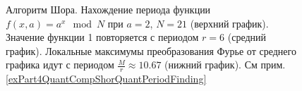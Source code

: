 \begin{figure}
\centering








\caption{Алгоритм Шора. Нахождение периода функции 
  $f\left(x, a\right) = a^x \mod{N}$ при $a=2$, $N = 21$ (верхний график). 
  Значение функции 1 повторяется с периодом $r=6$ (средний график). 
  Локальные максимумы преобразования Фурье от среднего графика 
  идут с периодом $\frac{M}{r} \approx 10.67$ (нижний график). См
  прим. \ref{exPart4QuantCompShorQuantPeriodFinding}}
\label{picPart4QuantCompShorQuantPart}
\end{figure}
